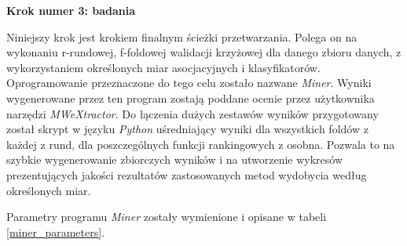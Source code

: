 \par
\noindent\textbf{Krok numer 3: badania}
\par
Niniejszy krok jest krokiem finalnym ścieżki przetwarzania.
Polega on na wykonaniu r-rundowej, f-foldowej walidacji krzyżowej dla danego zbioru danych, z wykorzystaniem określonych miar asocjacyjnych i klasyfikatorów.
Oprogramowanie przeznaczone do tego celu zostało nazwane \emph{Miner}.
Wyniki wygenerowane przez ten program zostają poddane ocenie przez użytkownika narzędzi \emph{MWeXtractor}. 
Do łączenia dużych zestawów wyników przygotowany został skrypt w języku \emph{Python} uśredniający wyniki dla wszystkich foldów z każdej z rund, dla poszczególnych funkcji rankingowych z osobna.
Pozwala to na szybkie wygenerowanie zbiorczych wyników i na utworzenie wykresów prezentujących jakości rezultatów zastosowanych metod wydobycia według określonych miar.
\par
Parametry programu \emph{Miner} zostały wymienione i opisane w tabeli \ref{miner_parameters}.

